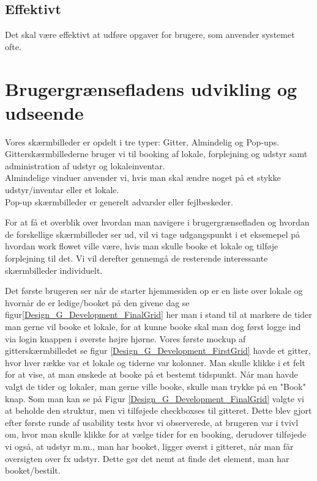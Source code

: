 \subsection{Effektivt}
Det skal være effektivt at udføre opgaver for brugere, som anvender systemet ofte.

\section{Brugergrænsefladens udvikling og udseende}
\label{Design_G_Development}
Vores skærmbilleder er opdelt i tre typer: Gitter, Almindelig og Pop-ups. 
\\Gitterskærmbillederne bruger vi til booking af lokale, forplejning og udstyr samt administration af udstyr og lokaleinventar.
\\Almindelige vinduer anvender vi, hvis man skal ændre noget på et stykke udstyr/inventar eller et lokale.
\\Pop-up skærmbilleder er generelt advarsler eller fejlbeskeder.

For at få et overblik over hvordan man navigere i brugergrænsefladen og hvordan de forskellige skærmbilleder ser ud, vil vi tage udgangspunkt i et eksemepel på hvordan work flowet ville være, hvis man skulle booke et lokale og tilføje forplejning til det. Vi vil derefter gennemgå de resterende interessante skærmbilleder individuelt.

Det første brugeren ser når de starter hjemmesiden op er en liste over lokale og hvornår de er ledige/booket på den givene dag se figur\ref{Design_G_Development_FinalGrid} her man i stand til at markere de tider man gerne vil booke et lokale, for at kunne booke skal man dog først logge ind via login knappen i øverste højre hjørne. 
Vores første mockup af gitterskærmbilledet se figur \ref{Design_G_Development_FirstGrid} havde et gitter, hvor hver række var et lokale og tiderne var kolonner. Man skulle klikke i et felt for at vise, at man ønskede at booke på et bestemt tidspunkt. Når man havde valgt de tider og lokaler, man gerne ville booke, skulle man trykke på en "Book" knap. 
Som man kan se på Figur \ref{Design_G_Development_FinalGrid} valgte vi at beholde den struktur, men vi tilføjede checkboxses til gitteret. Dette blev gjort efter første runde af usability tests hvor vi observerede, at brugeren var i tvivl om, hvor man skulle klikke for at vælge tider for en booking, derudover tilføjede vi også, at udstyr m.m., man har booket, ligger øverst i gitteret, når man får oversigten over fx udstyr. Dette gør det nemt at finde det element, man har booket/bestilt.

